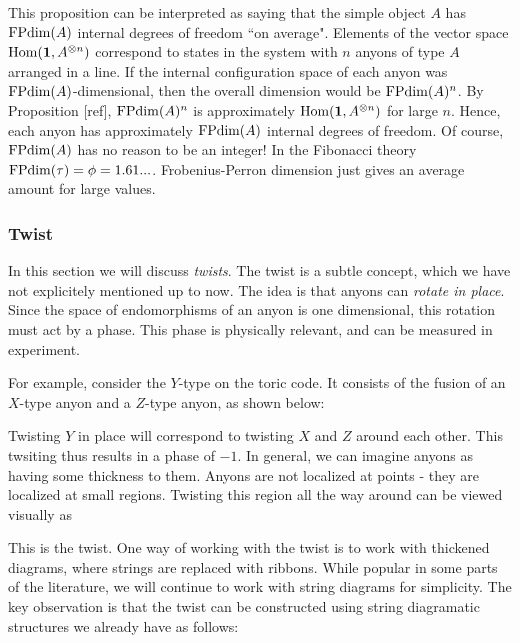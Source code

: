 This proposition can be interpreted as saying that the simple object $A$ has $\operatorname{FPdim}(A)$ internal degrees of freedom ``on average". Elements of the vector space $\operatorname{Hom}({\mathbf 1},A^{\otimes n})$ correspond to states in the system with $n$ anyons of type $A$ arranged in a line. If the internal configuration space of each anyon was $\operatorname{FPdim}(A)$-dimensional, then the overall dimension would be $\operatorname{FPdim}(A)^n$. By Proposition [ref], $\operatorname{FPdim}(A)^n$ is approximately $\operatorname{Hom}({\mathbf 1},A^{\otimes n})$ for large $n$. Hence, each anyon has approximately $\operatorname{FPdim}(A)$ internal degrees of freedom. Of course, $\operatorname{FPdim}(A)$ has no reason to be an integer! In the Fibonacci theory $\operatorname{FPdim}(\tau)=\phi=1.61...$. Frobenius-Perron dimension just gives an average amount for large values.


\subsubsection{Twist}

In this section we will discuss \textit{twists}. The twist is a subtle concept, which we have not explicitely mentioned up to now. The idea is that anyons can \textit{rotate in place}. Since the space of endomorphisms of an anyon is one dimensional, this rotation must act by a phase. This phase is physically relevant, and can be measured in experiment.

For example, consider the $Y$-type on the toric code. It consists of the fusion of an $X$-type anyon and a $Z$-type anyon, as shown below:


Twisting $Y$ in place will correspond to twisting $X$ and $Z$ around each other. This twsiting thus results in a phase of $-1$. In general, we can imagine anyons as having some thickness to them. Anyons are not localized at points - they are localized at small regions. Twisting this region all the way around can be viewed visually as


This is the twist. One way of working with the twist is to work with thickened diagrams, where strings are replaced with ribbons. While popular in some parts of the literature, we will continue to work with string diagrams for simplicity. The key observation is that the twist can be constructed using string diagramatic structures we already have as follows:

